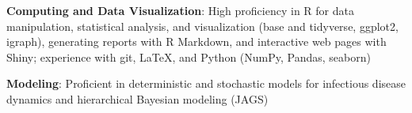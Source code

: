 \documentclass{cv}
\begin{document}
\textbf{Computing and Data Visualization}: High proficiency in R for data manipulation, statistical analysis, and visualization (base and tidyverse, ggplot2, igraph), generating reports with R Markdown, and interactive web pages with Shiny; experience with git, \LaTeX, and Python (NumPy, Pandas, seaborn)

\textbf{Modeling}: Proficient in deterministic and stochastic models for infectious disease dynamics and hierarchical Bayesian modeling (JAGS)
\end{document}
